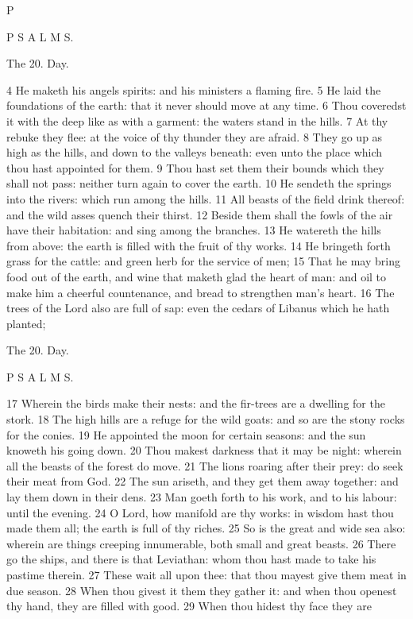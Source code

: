 P

P S A L M S.

The 20. Day.

4 He maketh his angels spirits: and his ministers a flaming fire. 5 He laid the foundations of the earth: that it never should move at any time. 6 Thou coveredst it with the deep like as with a garment: the waters stand in the hills. 7 At thy rebuke they flee: at the voice of thy thunder they are afraid. 8 They go up as high as the hills, and down to the valleys beneath: even unto the place which thou hast appointed for them. 9 Thou hast set them their bounds which they shall not pass: neither turn again to cover the earth. 10 He sendeth the springs into the rivers: which run among the hills. 11 All beasts of the field drink thereof: and the wild asses quench their thirst. 12 Beside them shall the fowls of the air have their habitation: and sing among the branches. 13 He watereth the hills from above: the earth is filled with the fruit of thy works. 14 He bringeth forth grass for the cattle: and green herb for the service of men; 15 That he may bring food out of the earth, and wine that maketh glad the heart of man: and oil to make him a cheerful countenance, and bread to strengthen man's heart. 16 The trees of the Lord also are full of sap: even the cedars of Libanus which he hath planted;

The 20. Day.

P S A L M S.

17 Wherein the birds make their nests: and the fir-trees are a dwelling for the stork. 18 The high hills are a refuge for the wild goats: and so are the stony rocks for the conies. 19 He appointed the moon for certain seasons: and the sun knoweth his going down. 20 Thou makest darkness that it may be night: wherein all the beasts of the forest do move. 21 The lions roaring after their prey: do seek their meat from God. 22 The sun ariseth, and they get them away together: and lay them down in their dens. 23 Man goeth forth to his work, and to his labour: until the evening. 24 O Lord, how manifold are thy works: in wisdom hast thou made them all; the earth is full of thy riches. 25 So is the great and wide sea also: wherein are things creeping innumerable, both small and great beasts. 26 There go the ships, and there is that Leviathan: whom thou hast made to take his pastime therein. 27 These wait all upon thee: that thou mayest give them meat in due season. 28 When thou givest it them they gather it: and when thou openest thy hand, they are filled with good. 29 When thou hidest thy face they are

